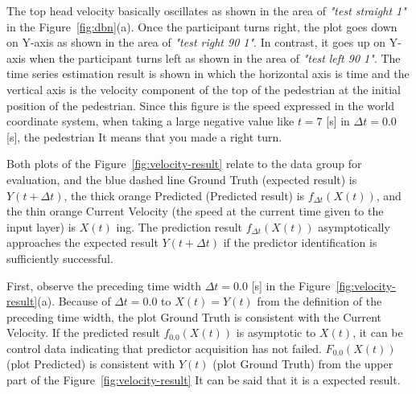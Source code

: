\documentclass{sigchi}
\begin{document}
The top head velocity basically oscillates as shown in the area of \textit{"test straight 1"} in the Figure~\ref{fig:dbn}(a). Once the participant turns right, the plot goes down on Y-axis as shown in the area of \textit{"test right 90 1"}. In contrast, it goes up on Y-axis when the participant turns left as shown in the area of \textit{"test left 90 1"}. The time series estimation result is shown in which the horizontal axis is time and the vertical axis is the velocity component of the top of the pedestrian at the initial position of the pedestrian. Since this figure is the speed expressed in the world coordinate system, when taking a large negative value like $ t = 7 $ [s] in $ \Delta t = 0.0 $ [s], the pedestrian It means that you made a right turn.



Both plots of the Figure~\ref{fig:velocity-result} relate to the data group for evaluation, and the blue dashed line Ground Truth (expected result) is $ Y (t + \Delta t) $, the thick orange Predicted (Predicted result) is $ f_ {\Delta t} (X (t)) $, and the thin orange Current Velocity (the speed at the current time given to the input layer) is $ X (t) $ ing. The prediction result $ f_ {\Delta t} (X (t)) $ asymptotically approaches the expected result $ Y (t + \Delta t) $ if the predictor identification is sufficiently successful.

First, observe the preceding time width $ \Delta t = 0.0 $ [s] in the Figure~\ref{fig:velocity-result}(a). Because of $ \Delta t = 0.0 $ to $ X (t) = Y (t) $ from the definition of the preceding time width, the plot Ground Truth is consistent with the Current Velocity. If the predicted result $ f_ {0.0} (X (t)) $ is asymptotic to $ X (t) $, it can be control data indicating that predictor acquisition has not failed. $ F_ {0.0} (X (t)) $ (plot Predicted) is consistent with $ Y (t) $ (plot Ground Truth) from the upper part of the Figure~\ref{fig:velocity-result} It can be said that it is a expected result.
\end{document}
